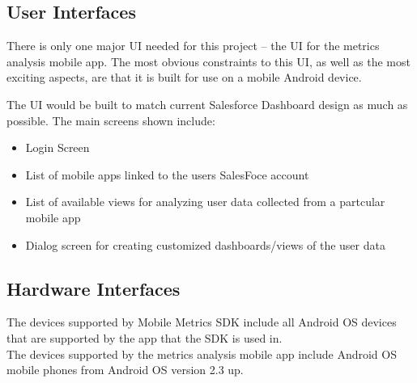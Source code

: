 \documentclass[12pt,oneside,letterpaper]{article}
\begin{document}
\subsection{User Interfaces}
There is only one major UI needed for this project -- the UI for the metrics analysis mobile app. The most obvious constraints to this UI, as well as the most exciting aspects, are that it is built for use on a mobile Android device.
\newline

The UI would be built to match current Salesforce Dashboard design as much as possible. The main screens shown include:
\begin{itemize}
\item Login Screen
\item List of mobile apps linked to the users SalesFoce account
\item List of available views for analyzing user data collected from a partcular mobile app
\item Dialog screen for creating customized dashboards/views of the user data
\end{itemize}
\subsection{Hardware Interfaces}
The devices supported by Mobile Metrics SDK include all Android OS devices that are supported by the app that the SDK is used in.\\
The devices supported by the metrics analysis mobile app include Android OS mobile phones from Android OS version 2.3 up.
\end{document}
